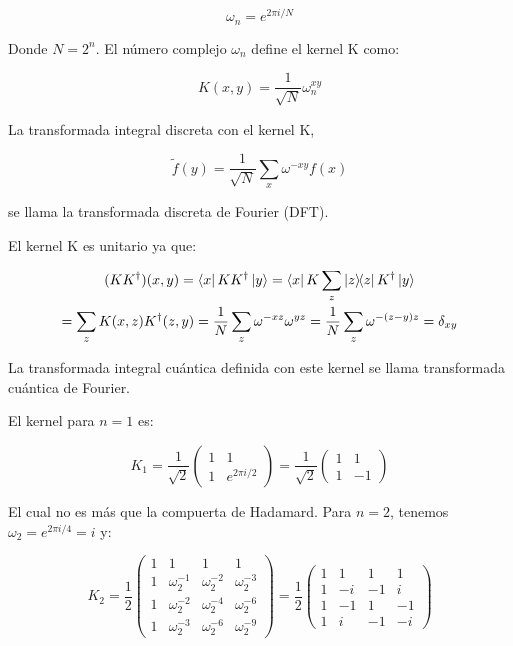 \begin{equation}
    \omega_n = e^{2\pi i/N}
\end{equation}

Donde $N = 2^n$. El número complejo $\omega_n$ define el kernel K como:

\begin{equation}
    K(x,y) = \frac{1}{\sqrt{N}} \omega_n^{x y}
\end{equation}

La transformada integral discreta con el kernel K,

\begin{equation}
    \tilde{f}(y) = \frac{1}{\sqrt{N}} \sum\limits_x \omega^{-x y} f(x)
\end{equation}

se llama la transformada discreta de Fourier (DFT).

El kernel K es unitario ya que:

\begin{multline}
    (K K^\dagger)(x,y) = \bra{x} K K^\dagger \ket{y}
    = \bra{x} K \sum\limits_z \ketbra{z}{z} K^\dagger \ket{y} \\
    = \sum\limits_z K(x,z) K^\dagger(z,y) 
    = \frac{1}{N} \sum\limits_z \omega^{-x z} \omega^{y z} 
    = \frac{1}{N} \sum\limits_z \omega^{- (z-y) z} 
    = \delta_{x y}
\end{multline}

La transformada integral cuántica definida con este kernel se llama transformada cuántica de Fourier.

El kernel para $n = 1$ es:

\begin{equation}
    K_1 = \frac{1}{\sqrt{2}}
    \begin{pmatrix}
        1 & 1 \\
        1 & e^{2\pi i/2}
    \end{pmatrix} =
    \frac{1}{\sqrt{2}}
    \begin{pmatrix}
        1 & 1 \\
        1 & -1
    \end{pmatrix}
\end{equation}

El cual no es más que la compuerta de Hadamard. Para $n = 2$, tenemos $\omega_2 = e^{2\pi i/4} = i$ y:

\begin{equation}
    K_2 = \frac{1}{2}
    \begin{pmatrix}
        1 & 1 & 1 & 1 \\
        1 & \omega_2^{-1} & \omega_2^{-2} & \omega_2^{-3} \\
        1 & \omega_2^{-2} & \omega_2^{-4} & \omega_2^{-6} \\
        1 & \omega_2^{-3} & \omega_2^{-6} & \omega_2^{-9}
    \end{pmatrix} =
    \frac{1}{2}
    \begin{pmatrix}
        1 & 1 & 1 & 1 \\
        1 & -i & -1 & i \\
        1 & -1 & 1 & -1 \\
        1 & i & -1 & -i
    \end{pmatrix}
\end{equation}

